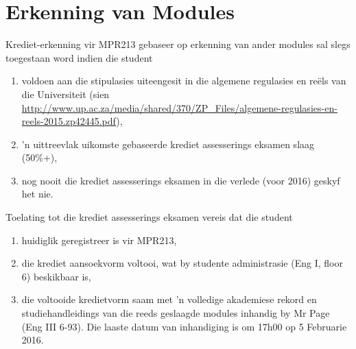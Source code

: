 \newpage
\section{Erkenning van Modules} \label{sec:credit_study_guide}
    \noindent
    Krediet-erkenning vir MPR213 gebaseer op erkenning van ander modules sal
    slegs toegestaan word indien die student
    \begin{enumerate}
        \item voldoen aan die stipulasies uiteengesit in die algemene
            regulasies en re\"els van die Universiteit (sien
            \url{http://www.up.ac.za/media/shared/370/ZP_Files/algemene-regulasies-en-reels-2015.zp42445.pdf}),
        \item 'n uittreevlak uikomste gebaseerde krediet assesserings eksamen
            slaag (50\%+),
        \item nog nooit die krediet assesserings eksamen in die verlede (voor
            2016) geskyf het nie.
    \end{enumerate}

    \noindent
    Toelating tot die krediet assesserings eksamen vereis dat die student
    \begin{enumerate}
        \item huidiglik geregistreer is vir MPR213,
        \item die krediet aansoekvorm voltooi, wat by studente administrasie
            (Eng I, floor 6) beskikbaar is,
        \item die voltooide kredietvorm saam met 'n volledige akademiese rekord
            en studiehandleidings van die reeds geslaagde modules inhandig by
            Mr Page (Eng III 6-93). Die laaste datum van inhandiging is om
            17h00 op 5 Februarie 2016.
    \end{enumerate}

